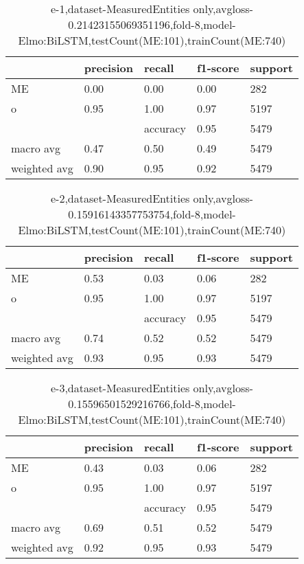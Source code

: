 \begin{table}[!ht] 
\centering
\caption{e-1,dataset-MeasuredEntities only,avgloss-0.21423155069351196,fold-8,model-Elmo:BiLSTM,testCount(ME:101),trainCount(ME:740)}\label{e-1data-meS.tsv}
\begin{tabularx}{300pt}{|X|X|X|X|X|}
\hline
&precision&recall&f1-score&support\\
\hline
ME&0.00&0.00&0.00&282\\
\hline
o&0.95&1.00&0.97&5197\\
\hline
&&accuracy&0.95&5479\\
\hline
macro avg&0.47&0.50&0.49&5479\\
\hline
weighted avg&0.90&0.95&0.92&5479\\
\hline
\end{tabularx}
\end{table}
\begin{table}[!ht] 
\centering
\caption{e-2,dataset-MeasuredEntities only,avgloss-0.15916143357753754,fold-8,model-Elmo:BiLSTM,testCount(ME:101),trainCount(ME:740)}\label{e-2data-meS.tsv}
\begin{tabularx}{300pt}{|X|X|X|X|X|}
\hline
&precision&recall&f1-score&support\\
\hline
ME&0.53&0.03&0.06&282\\
\hline
o&0.95&1.00&0.97&5197\\
\hline
&&accuracy&0.95&5479\\
\hline
macro avg&0.74&0.52&0.52&5479\\
\hline
weighted avg&0.93&0.95&0.93&5479\\
\hline
\end{tabularx}
\end{table}
\begin{table}[!ht] 
\centering
\caption{e-3,dataset-MeasuredEntities only,avgloss-0.15596501529216766,fold-8,model-Elmo:BiLSTM,testCount(ME:101),trainCount(ME:740)}\label{e-3data-meS.tsv}
\begin{tabularx}{300pt}{|X|X|X|X|X|}
\hline
&precision&recall&f1-score&support\\
\hline
ME&0.43&0.03&0.06&282\\
\hline
o&0.95&1.00&0.97&5197\\
\hline
&&accuracy&0.95&5479\\
\hline
macro avg&0.69&0.51&0.52&5479\\
\hline
weighted avg&0.92&0.95&0.93&5479\\
\hline
\end{tabularx}
\end{table}
